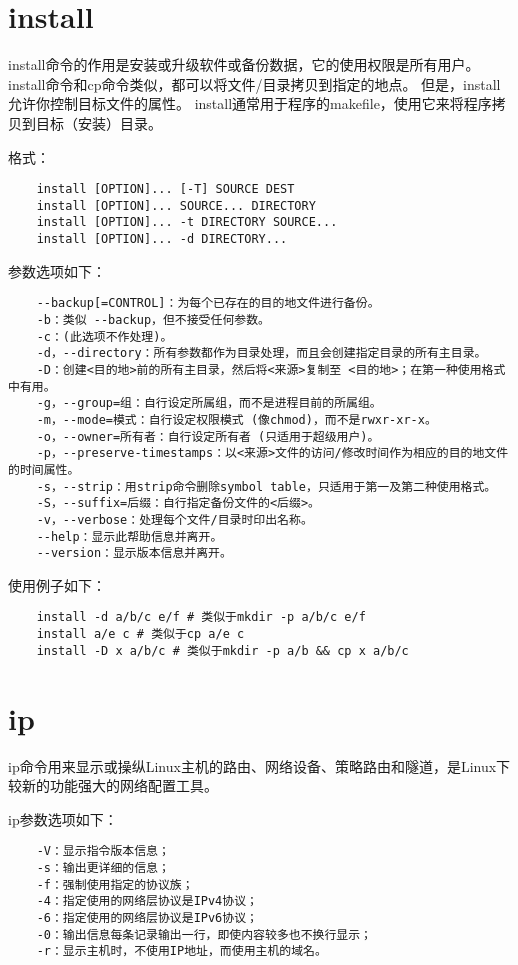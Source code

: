 \documentclass[a4paper,left=2.5cm,right=2.5cm,11pt]{article}
\begin{document}
\section{install}
	install命令的作用是安装或升级软件或备份数据，它的使用权限是所有用户。
	install命令和cp命令类似，都可以将文件/目录拷贝到指定的地点。
	但是，install允许你控制目标文件的属性。
	install通常用于程序的makefile，使用它来将程序拷贝到目标（安装）目录。\par

	格式：
	\begin{lstlisting}
	install [OPTION]... [-T] SOURCE DEST 
	install [OPTION]... SOURCE... DIRECTORY 
	install [OPTION]... -t DIRECTORY SOURCE... 
	install [OPTION]... -d DIRECTORY...
	\end{lstlisting}

	参数选项如下：
	\begin{lstlisting}
	--backup[=CONTROL]：为每个已存在的目的地文件进行备份。 
	-b：类似 --backup，但不接受任何参数。 
	-c：(此选项不作处理)。 
	-d，--directory：所有参数都作为目录处理，而且会创建指定目录的所有主目录。 
	-D：创建<目的地>前的所有主目录，然后将<来源>复制至 <目的地>；在第一种使用格式中有用。 
	-g，--group=组：自行设定所属组，而不是进程目前的所属组。 
	-m，--mode=模式：自行设定权限模式 (像chmod)，而不是rwxr-xr-x。 
	-o，--owner=所有者：自行设定所有者 (只适用于超级用户)。 
	-p，--preserve-timestamps：以<来源>文件的访问/修改时间作为相应的目的地文件的时间属性。 
	-s，--strip：用strip命令删除symbol table，只适用于第一及第二种使用格式。 
	-S，--suffix=后缀：自行指定备份文件的<后缀>。 
	-v，--verbose：处理每个文件/目录时印出名称。 
	--help：显示此帮助信息并离开。 
	--version：显示版本信息并离开。
	\end{lstlisting}

	使用例子如下：
	\begin{lstlisting}
	install -d a/b/c e/f # 类似于mkdir -p a/b/c e/f
	install a/e c # 类似于cp a/e c
	install -D x a/b/c # 类似于mkdir -p a/b && cp x a/b/c
	\end{lstlisting}

\section{ip}
	ip命令用来显示或操纵Linux主机的路由、网络设备、策略路由和隧道，是Linux下较新的功能强大的网络配置工具。\par

	ip参数选项如下：
	\begin{lstlisting}
	-V：显示指令版本信息； 
	-s：输出更详细的信息； 
	-f：强制使用指定的协议族； 
	-4：指定使用的网络层协议是IPv4协议； 
	-6：指定使用的网络层协议是IPv6协议； 
	-0：输出信息每条记录输出一行，即使内容较多也不换行显示； 
	-r：显示主机时，不使用IP地址，而使用主机的域名。
	\end{lstlisting}
\end{document}

